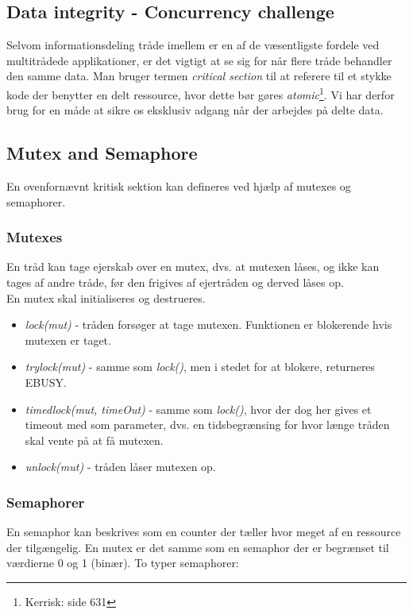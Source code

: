 \newpage

\subsection{Data integrity - Concurrency challenge}

Selvom informationsdeling tråde imellem er en af de væsentligste fordele ved multitrådede applikationer, er det vigtigt at se sig for når flere tråde behandler den samme data.
Man bruger termen \textit{critical section} til at referere til et stykke kode der benytter en delt ressource, hvor dette bør gøres \textit{atomic}\footnote{Kerrisk: side 631}. Vi har derfor brug for en måde at sikre os eksklusiv adgang når der arbejdes på delte data.

\subsection{Mutex and Semaphore}

En ovenfornævnt kritisk sektion kan defineres ved hjælp af mutexes og semaphorer.

\subsubsection{Mutexes}

En tråd kan tage ejerskab over en mutex, dvs. at mutexen låses, og ikke kan tages af andre tråde, før den frigives af ejertråden og derved låses op. \\

En mutex skal initialiseres og destrueres.

\begin{itemize}
	\item \textit{lock(mut)} - tråden forsøger at tage mutexen. Funktionen er blokerende hvis mutexen er taget.
	\item \textit{trylock(mut)} - samme som \textit{lock()}, men i stedet for at blokere, returneres EBUSY.
	\item \textit{timedlock(mut, timeOut)} - samme som \textit{lock()}, hvor der dog her gives et timeout med som parameter, dvs. en tidsbegrænsing for hvor længe tråden skal vente på at få mutexen.
	\item \textit{unlock(mut)} - tråden låser mutexen op. 
\end{itemize}

\subsubsection{Semaphorer}
En semaphor kan beskrives som en counter der tæller hvor meget af en ressource der tilgængelig.
En mutex er det samme som en semaphor der er begrænset til værdierne 0 og 1 (binær).
To typer semaphorer:

